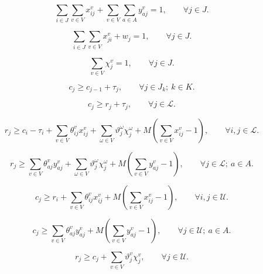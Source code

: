\documentclass[11pt]{article}
\begin{document}
\begin{equation}
\sum_{i\in J}\sum_{v\in V} x_{ij}^{v}
+
\sum_{v\in V}\sum_{a\in A} y_{aj}^{v}
= 1,
\qquad \forall j \in J.
\tag{7}
\end{equation}

\begin{equation}
\sum_{i\in J}\sum_{v\in V} x_{ji}^{v} + w_j = 1,
\qquad \forall j \in J.
\tag{8}
\end{equation}

\begin{equation}
\sum_{v\in V} \chi_j^{v} = 1,
\qquad \forall j \in J.
\tag{9}
\end{equation}

\begin{equation}
c_j \ge c_{j-1} + \tau_j,
\qquad \forall j \in J_k;\ k \in K.
\tag{10}
\end{equation}

\begin{equation}
c_j \ge r_j + \tau_j,
\qquad \forall j \in \mathcal{L}.
\tag{11}
\end{equation}

\begin{equation}
r_j
\ge
c_i - \tau_i
+
\sum_{v\in V}\theta_{ij}^{v}x_{ij}^{v}
+
\sum_{\omega\in V}\vartheta_j^{\omega}\chi_j^{\omega}
+
M\left(\sum_{v\in V}x_{ij}^{v}-1\right),
\qquad \forall i,j \in \mathcal{L}.
\tag{12}
\end{equation}

\begin{equation}
r_j
\ge
\sum_{v\in V}\theta_{aj}^{v}y_{aj}^{v}
+
\sum_{\omega\in V}\vartheta_j^{\omega}\chi_j^{\omega}
+
M\left(\sum_{v\in V}y_{aj}^{v}-1\right),
\qquad \forall j \in \mathcal{L};\ a \in A.
\tag{13}
\end{equation}

\begin{equation}
c_j
\ge
r_i
+
\sum_{v\in V}\theta_{ij}^{v}x_{ij}^{v}
+
M\left(\sum_{v\in V}x_{ij}^{v}-1\right),
\qquad \forall i,j \in \mathcal{U}.
\tag{14}
\end{equation}

\begin{equation}
c_j
\ge
\sum_{v\in V}\theta_{aj}^{v}y_{aj}^{v}
+
M\left(\sum_{v\in V}y_{aj}^{v}-1\right),
\qquad \forall j \in \mathcal{U};\ a \in A.
\tag{15}
\end{equation}

\begin{equation}
r_j
\ge
c_j
+
\sum_{v\in V}\vartheta_j^{v}\chi_j^{v},
\qquad \forall j \in \mathcal{U}.
\tag{16}
\end{equation}
\end{document}

